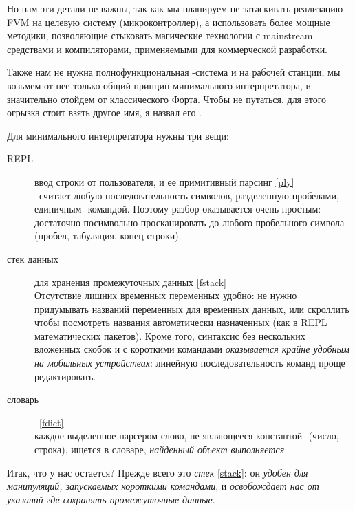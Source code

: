 Но нам эти детали не важны, так как мы планируем не затаскивать реализацию FVM
на целевую систему (микроконтроллер), а использовать более мощные методики,
позволяющие стыковать магические технологии с mainstream средствами и
компиляторами, применяемыми для коммерческой разработки.

Также нам не нужна полнофункциональная \F-система и на рабочей станции, мы
возьмем от нее только общий принцип минимального интерпретатора, и значительно
отойдем от классического Форта. Чтобы не путаться, для этого огрызка стоит взять
другое имя, я назвал его \pyf.


Для минимального интерпретатора нужны три вещи:
\begin{description}
\item[REPL] ввод строки от пользователя, и ее примитивный парсинг \ref{ply}\\
\F\ считает любую последовательность символов, разделенную пробелами,
единичным -командой. Поэтому разбор оказывается очень простым:
достаточно посимвольно просканировать  до любого пробельного
символа (пробел, табуляция, конец строки).
\item[стек данных] для хранения промежуточных данных \ref{fstack}\\
Отсутствие лишних временных переменных удобно: не нужно придумывать названий
переменных для временных данных, или скроллить чтобы посмотреть названия
автоматически назначенных (как в REPL математических пакетов). Кроме того,
синтаксис без нескольких вложенных скобок и с короткими командами
\textit{оказывается крайне удобным на мобильных устройствах}: линейную
последовательность команд проще редактировать.
\item[словарь]\ \ref{fdict}\\
каждое выделенное парсером слово, не являющееся константой-
(число, строка), ищется в словаре, \emph{найденный объект
выполняется}
\end{description}

\label{fstack}

Итак, что у нас остается? Прежде всего это \emph{стек} \ref{stack}: он
\textit{удобен для манипуляций, запускаемых короткими командами}, и
\emph{освобождает нас от указаний где сохранять промежуточные данные}.

\medskip
{}









\secup
